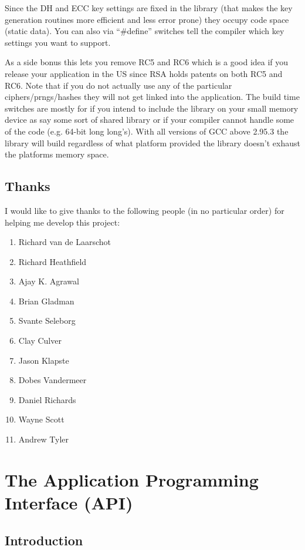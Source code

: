 \documentclass{book}
\begin{document}
Since the DH and ECC key settings are fixed in the library (that makes the key generation routines more efficient and less
error prone) they occupy code space (static data).  You can also via ``\#define'' switches tell the compiler which
key settings you want to support.

As a side bonus this lets you remove RC5 and RC6 which is a good idea if you release your application in the US since RSA holds
patents on both RC5 and RC6.  Note that if you do not actually use any of the particular ciphers/prngs/hashes they will not get 
linked into the application.  The build time switches are mostly for if you intend to include the library on your small memory device
as say some sort of shared library or if your compiler cannot handle some of the code (e.g. 64-bit long long's).  With all 
versions of GCC above 2.95.3 the library will build regardless of what platform provided the library doesn't exhaust 
the platforms memory space.

\section{Thanks}
I would like to give thanks to the following people (in no particular order) for helping me develop this project:
\begin{enumerate}
   \item Richard van de Laarschot
   \item Richard Heathfield
   \item Ajay K. Agrawal
   \item Brian Gladman
   \item Svante Seleborg
   \item Clay Culver
   \item Jason Klapste
   \item Dobes Vandermeer
   \item Daniel Richards
   \item Wayne Scott
   \item Andrew Tyler
\end{enumerate}

\chapter{The Application Programming Interface (API)}
\section{Introduction}
 
\end{document}
